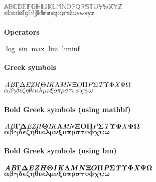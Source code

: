 \documentclass[class=scrartcl,crop=false]{standalone}
\begin{document}
$\mathbb{ABCDEFGHIJKLMNOPQRSTUVWXYZ}$\\
$\mathbb{abcdefghijklmnopqrstuvwxyz}$

\paragraph{Operators}

$\log \sin \max \lim \liminf$

\paragraph{Greek symbols}

$\mathit{A} \mathit{B} \Gamma \Delta \mathit{E} \mathit{Z} \mathit{H} \Theta \mathit{I} \mathit{K} \Lambda \mathit{M} \mathit{N} \Xi O \Pi \mathit{P} \Sigma \mathit{T} \Upsilon \Phi \mathit{X} \Psi \Omega$\\
$\alpha \beta \gamma \delta \epsilon \zeta \eta \theta \iota \kappa \lambda \mu \nu \xi o \pi \rho \sigma \tau \upsilon \phi \chi \psi \omega$



\paragraph{Bold Greek symbols (using mathbf)}

$\mathbf{\mathit{A} \mathit{B} \Gamma \Delta \mathit{E} \mathit{Z} \mathit{H} \Theta \mathit{I} \mathit{K} \Lambda \mathit{M} \mathit{N} \Xi O \Pi \mathit{P} \Sigma \mathit{T} \Upsilon \Phi \mathit{X} \Psi \Omega}$\\
$\mathbf{\alpha \beta \gamma \delta \epsilon \zeta \eta \theta \iota \kappa \lambda \mu \nu \xi o \pi \rho \sigma \tau \upsilon \phi \chi \psi \omega}$

\paragraph{Bold Greek symbols (using bm)}

$\bm{\mathit{A} \mathit{B} \Gamma \Delta \mathit{E} \mathit{Z} \mathit{H} \Theta \mathit{I} \mathit{K} \Lambda \mathit{M} \mathit{N} \Xi O \Pi \mathit{P} \Sigma \mathit{T} \Upsilon \Phi \mathit{X} \Psi \Omega}$\\
$\bm{\alpha \beta \gamma \delta \epsilon \zeta \eta \theta \iota \kappa \lambda \mu \nu \xi o \pi \rho \sigma \tau \upsilon \phi \chi \psi \omega}$


\end{document}
